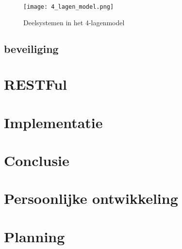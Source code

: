 \documentclass[a4paper,11pt,oneside]{report}
\begin{document}
\begin{figure}[ht!]
\centering
\texttt{[image: 4\_lagen\_model.png]}\\
\caption{Deelsystemen in het 4-lagenmodel}
\label{fig:vier_lagen_model}
\end{figure}






\section{beveiliging}
\chapter{RESTFul}



\chapter{Implementatie}











\chapter{Conclusie}




\appendix
\chapter{Persoonlijke ontwikkeling}
\lipsum[1]

\chapter{Planning}
  \label{chap:planning}


\newpage

\printglossary


\renewcommand{\bibname}{Bronvermeldingen}



\nocite{*}

\end{document}
